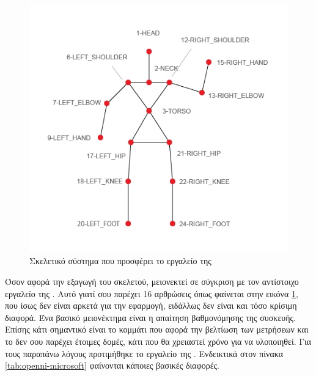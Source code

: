 \begin{figure}[H]
    \centering
    \includegraphics[width=.7\textwidth, keepaspectratio]{fig/openni-skeleton.png}
    \caption{Σκελετικό σύστημα που προσφέρει το εργαλείο της }
    \label{fig:openni-skeleton}
\end{figure}

Όσον αφορά την εξαγωγή του σκελετού, μειονεκτεί σε σύγκριση με τον αντίστοιχο εργαλείο της . Αυτό γιατί σου παρέχει 16 αρθρώσεις όπως φαίνεται στην εικόνα \ref{fig:openni-skeleton}, που ίσως δεν είναι αρκετά για την εφαρμογή, ειδάλλως δεν είναι και τόσο κρίσιμη διαφορά. Ένα βασικό μειονέκτημα είναι η απαίτηση βαθμονόμησης της συσκευής. Επίσης κάτι σημαντικό είναι το κομμάτι που αφορά την βελτίωση των μετρήσεων και το  δεν σου παρέχει έτοιμες δομές, κάτι που θα χρειαστεί χρόνο για να υλοποιηθεί. Για τους παραπάνω λόγους προτιμήθηκε το εργαλείο της . Ενδεικτικά στον πίνακα \ref{tab:openni-microsoft} φαίνονται κάποιες βασικές διαφορές.

